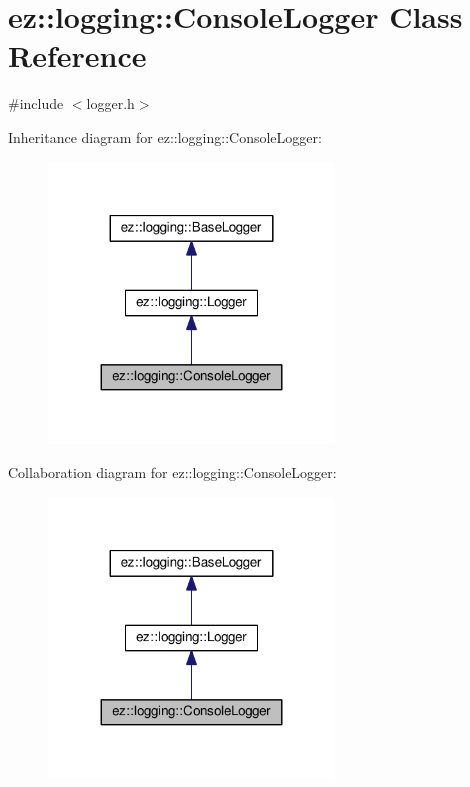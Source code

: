 \hypertarget{classez_1_1logging_1_1ConsoleLogger}{}\section{ez\+:\+:logging\+:\+:Console\+Logger Class Reference}
\label{classez_1_1logging_1_1ConsoleLogger}


{\ttfamily \#include $<$logger.\+h$>$}



Inheritance diagram for ez\+:\+:logging\+:\+:Console\+Logger\+:
\nopagebreak
\begin{figure}[H]
\begin{center}
\leavevmode
\includegraphics[width=215pt]{classez_1_1logging_1_1ConsoleLogger__inherit__graph}
\end{center}
\end{figure}


Collaboration diagram for ez\+:\+:logging\+:\+:Console\+Logger\+:
\nopagebreak
\begin{figure}[H]
\begin{center}
\leavevmode
\includegraphics[width=215pt]{classez_1_1logging_1_1ConsoleLogger__coll__graph}
\end{center}
\end{figure}
